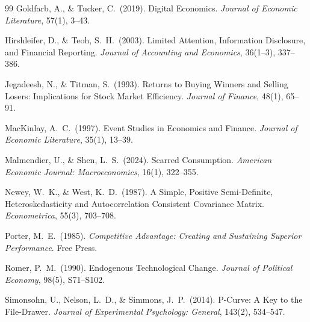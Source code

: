\documentclass[11pt,fontset=fandol,a4paper]{ctexart}
\begin{document}
\begin{thebibliography}{99}
Goldfarb, A., \& Tucker, C.\ (2019). Digital Economics. \emph{Journal of Economic Literature}, 57(1), 3--43.

Hirshleifer, D., \& Teoh, S.\ H.\ (2003). Limited Attention, Information Disclosure, and Financial Reporting. \emph{Journal of Accounting and Economics}, 36(1--3), 337--386.

Jegadeesh, N., \& Titman, S.\ (1993). Returns to Buying Winners and Selling Losers: Implications for Stock Market Efficiency. \emph{Journal of Finance}, 48(1), 65--91.

MacKinlay, A.\ C.\ (1997). Event Studies in Economics and Finance. \emph{Journal of Economic Literature}, 35(1), 13--39.

Malmendier, U., \& Shen, L.\ S.\ (2024). Scarred Consumption. \emph{American Economic Journal: Macroeconomics}, 16(1), 322--355.

Newey, W.\ K., \& West, K.\ D.\ (1987). A Simple, Positive Semi-Definite, Heteroskedasticity and Autocorrelation Consistent Covariance Matrix. \emph{Econometrica}, 55(3), 703--708.

Porter, M.\ E.\ (1985). \emph{Competitive Advantage: Creating and Sustaining Superior Performance}. Free Press.

Romer, P.\ M.\ (1990). Endogenous Technological Change. \emph{Journal of Political Economy}, 98(5), S71--S102.

Simonsohn, U., Nelson, L.\ D., \& Simmons, J.\ P.\ (2014). P-Curve: A Key to the File-Drawer. \emph{Journal of Experimental Psychology: General}, 143(2), 534--547.

\end{thebibliography}
\end{document}
